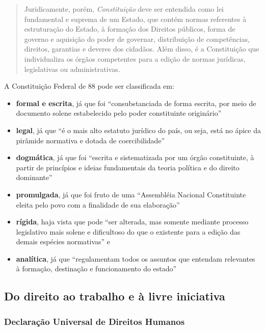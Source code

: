 \documentclass[]{article}
\providecommand{\tightlist}{%
  \setlength{\itemsep}{0pt}\setlength{\parskip}{0pt}}
\begin{document}
\begin{quote}
Juridicamente, porém, \emph{Constituição} deve ser entendida como lei
fundamental e suprema de um Estado, que contém normas referentes à
estruturação do Estado, à formação dos Direitos públicos, forma de
governo e aquisição do poder de governar, distribuição de competências,
direitos, garantias e deveres dos cidadãos. Além disso, é a Constituição
que individualiza os órgãos competentes para a edição de normas
jurídicas, legislativas ou administrativas.
\end{quote}

A Constituição Federal de 88 pode ser classificada em:

\begin{itemize}
\tightlist
\item
  \textbf{formal e escrita}, já que foi ``consubstanciada de forma
  escrita, por meio de documento solene estabelecido pelo poder
  constituinte originário'' \cite[p.~8]{moraes}
\item
  \textbf{legal}, já que ``é o mais alto estatuto jurídico do país, ou
  seja, está no ápice da pirâmide normativa e dotada de coercibilidade''
  \cite[p.~8]{moraes}
\item
  \textbf{dogmática}, já que foi ``escrita e sistematizada por um órgão
  constituinte, à partir de princípios e ideias fundamentais da teoria
  política e do direito dominante'' \cite[p.~8-9]{moraes}
\item
  \textbf{promulgada}, já que foi fruto de uma ``Assembléia Nacional
  Constituinte eleita pelo povo com a finalidade de sua elaboração''
  \cite[p.~9]{moraes}
\item
  \textbf{rígida}, haja vista que pode ``ser alterada, mas somente
  mediante processo legislativo mais solene e dificultoso do que o
  existente para a edição das demais espécies normativas''
  \cite[p.~9]{moraes} e
\item
  \textbf{analítica}, já que ``regulamentam todos os assuntos que
  entendam relevantes à formação, destinação e funcionamento do estado''
  \cite[p.~10]{moraes}
\end{itemize}

\subsection{Do direito ao trabalho e à livre
iniciativa}\label{do-direito-ao-trabalho-e-a-livre-iniciativa}

\subsubsection{Declaração Universal de Direitos
Humanos}\label{declaracao-universal-de-direitos-humanos}
\end{document}
